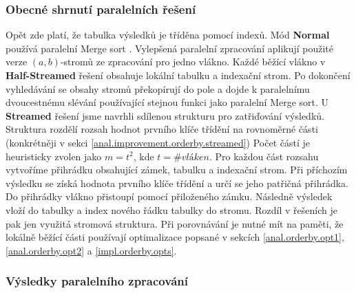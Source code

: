 \subsubsection{Obecné shrnutí paralelních řešení}

Opět zde platí, že tabulka výsledků je tříděna pomocí indexů.
Mód \textbf{Normal} používá paralelní Merge sort \citep{hpcsharp}.
Vylepšená paralelní zpracování aplikují použité verze $(a, b)$-stromů ze zpracování pro jedno vlákno. 
Každé běžící vlákno v \textbf{Half-Streamed} řešení obsahuje lokální tabulku a indexační strom. 
Po dokončení vyhledávání se obsahy stromů překopírují do pole a dojde k paralelnímu dvoucestnému slévání používající stejnou funkci jako paralelní Merge sort. 
U \textbf{Streamed} řešení jsme navrhli sdílenou strukturu pro zatřiďování výsledků.
Struktura rozdělí rozsah hodnot prvního klíče třídění na rovnoměrné části (konkrétněji v sekci \ref{anal.improvement.orderby.streamed})
Počet částí je heuristicky zvolen jako $m=t^2$, kde $t=\#vláken$. 
Pro každou část rozsahu vytvoříme přihrádku obsahující zámek, tabulku a indexační strom.
Při příchozím výsledku se získá hodnota prvního klíče třídění a určí se jeho patřičná přihrádka. 
Do přihrádky vlákno přistoupí pomocí přiloženého zámku.
Následně výsledek vloží do tabulky a index nového řádku tabulky do stromu.
Rozdíl v řešeních je pak jen využitá stromová struktura.
Při porovnávání je nutné mít na paměti, že lokálně běžící části používají optimalizace popsané v sekcích \ref{anal.orderby.opt1}, \ref{anal.orderby.opt2} a \ref{impl.orderby.opts}.  

\subsubsection{Výsledky paralelního zpracování}

